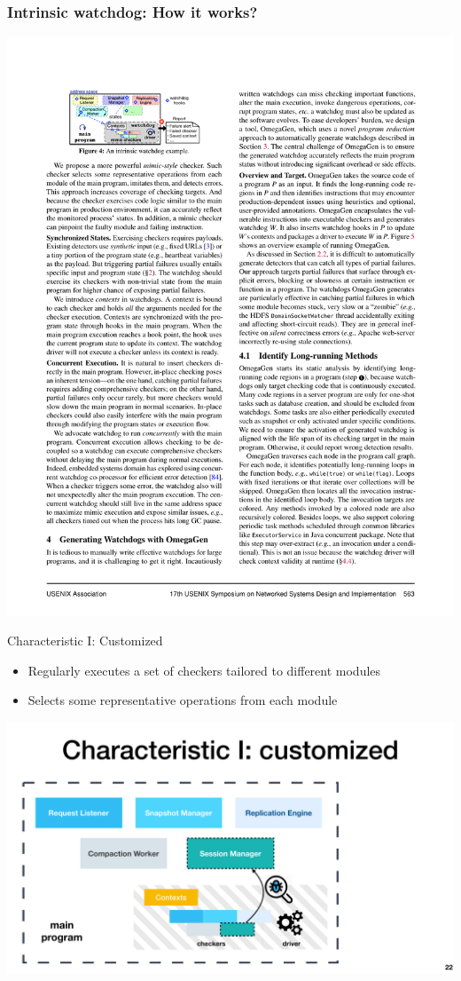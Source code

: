 \documentclass[aspectratio=169]{beamer}
\begin{document}
\begin{frame}
    \frametitle{Intrinsic watchdog: How it works?}

    \begin{center}
        \includegraphics[width=.9\textwidth]{fig/exmaple}
    \end{center}

\end{frame}

\begin{frame}{Characteristic I: Customized}
    \begin{itemize}
        \item Regularly executes a set of checkers tailored to different modules
        \item Selects some representative operations from each
        module
    \end{itemize}

    \begin{center}
        \includegraphics[width=.75\textwidth]{fig/customized}
    \end{center}
\end{frame}
\end{document}
